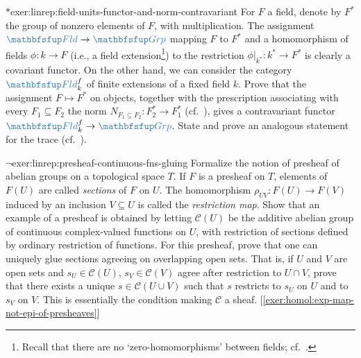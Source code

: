 \begin{exer}{$*$}{exer:linrep:field-units-functor-and-norm-contravariant}
  For $F$ a field, denote by $F^*$ the group of nonzero elements of
  $F$, with multiplication. The assignment
  $\categ{Fld} \to \categ{Grp}$ mapping $F$ to $F^*$ and a
  homomorphism of fields $\phi : k \to F$ (i.e., a field
  extension\footnote{Recall that there are no `zero-homomorphisms'
    between fields; cf.\ .})
  to the restriction $\phi|_{k^*} : k^* \to F^*$ is clearly a
  covariant functor. On the other hand, we can consider the category
  $\categ{Fld}^f_k$ of finite extensions of a fixed field $k$. Prove
  that the assignment $F \mapsto F^*$ on objects, together with the
  prescription associating with every $F_1 \subseteq F_2$ the norm
  $N_{F_1 \subseteq F_2} : F_2^* \to F_1^*$ (cf.\
  ), gives a contravariant
  functor $\categ{Fld}^f_k \to \categ{Grp}$.  State and prove an
  analogous statement for the trace (cf.\
  ).
\end{exer}

\begin{exer}{$\lnot$}{exer:linrep:presheaf-continuous-fns-gluing}
  Formalize the notion of presheaf of abelian groups on a topological
  space $T$. If $F$ is a presheaf on $T$, elements of $F(U)$ are
  called \emph{sections} of $F$ on $U$. The homomorphism
  $\rho_{UV} : F(U) \to F(V)$ induced by an inclusion $V \subseteq U$
  is called the \emph{restriction map}. Show that an example of a
  presheaf is obtained by letting $\mathcal{C}(U)$ be the additive
  abelian group of continuous complex-valued functions on $U$, with
  restriction of sections defined by ordinary restriction of
  functions.  For this presheaf, prove that one can uniquely glue
  sections agreeing on overlapping open sets. That is, if $U$ and $V$
  are open sets and $s_U \in \mathcal{C}(U)$, $s_V \in \mathcal{C}(V)$
  agree after restriction to $U \cap V$, prove that there exists a
  unique $s \in \mathcal{C}(U \cup V)$ such that $s$ restricts to
  $s_U$ on $U$ and to $s_V$ on $V$. This is essentially the condition
  making $\mathcal{C}$ a
  sheaf. [\ref{exer:homol:exp-map-not-epi-of-presheaves}]
\end{exer}

